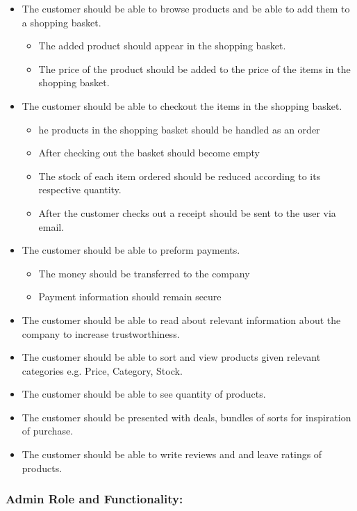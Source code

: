 \begin{itemize}
    \item The customer should be able to browse products and be able to add
    them to a shopping basket.
    \begin{itemize}
        \item The added product should appear in the shopping basket.
        \item The price of the product should be added to the price of the
        items in the shopping basket.
    \end{itemize}
\item The customer should be able to checkout the items in the shopping basket.
    \begin{itemize}
        \item he products in the shopping basket should be handled as an order
        \item After checking out the basket should become empty
        \item The stock of each item ordered should be reduced according to
        its respective quantity.
        \item After the customer checks out a receipt should be sent to the
        user via email.
    \end{itemize}
\item The customer should be able to preform payments.
    \begin{itemize}
        \item The money should be transferred to the company
        \item Payment information should remain secure
    \end{itemize}
    \item The customer should be able to read about relevant information
    about the company to increase trustworthiness.
    \item The customer should be able to sort and view  products given
    relevant categories e.g. Price, Category, Stock.
    \item The customer should be able to see quantity of products. 
    \item The customer should be presented with deals, bundles of sorts for
    inspiration of purchase.
    \item The customer should be able to write reviews and and leave ratings
    of products.
\end{itemize}

\subsubsection{Admin Role and Functionality:}

